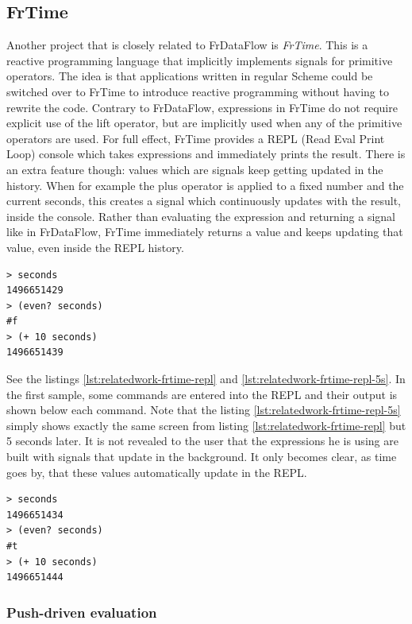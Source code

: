 \subsection{FrTime}

Another project that is closely related to FrDataFlow is \textit{FrTime}. This is a reactive programming language that implicitly implements signals for primitive operators. The idea is that applications written in regular Scheme could be switched over to FrTime to introduce reactive programming without having to rewrite the code. Contrary to FrDataFlow, expressions in FrTime do not require explicit use of the lift operator, but are implicitly used when any of the primitive operators are used. For full effect, FrTime provides a REPL (Read Eval Print Loop) console which takes expressions and immediately prints the result. There is an extra feature though: values which are signals keep getting updated in the history. When for example the plus operator is applied to a fixed number and the current seconds, this creates a signal which continuously updates with the result, inside the console. Rather than evaluating the expression and returning a signal like in FrDataFlow, FrTime immediately returns a value and keeps updating that value, even inside the REPL history. 

\begin{lstlisting}[caption={REPL in FrTime},captionpos=b,label={lst:relatedwork-frtime-repl}]
> seconds 			
1496651429
> (even? seconds) 
#f
> (+ 10 seconds)
1496651439
\end{lstlisting}

See the listings \ref{lst:relatedwork-frtime-repl} and \ref{lst:relatedwork-frtime-repl-5s}. In the first sample, some commands are entered into the REPL and their output is shown below each command.
Note that the listing \ref{lst:relatedwork-frtime-repl-5s} simply shows exactly the same screen from listing \ref{lst:relatedwork-frtime-repl} but 5 seconds later. It is not revealed to the user that the expressions he is using are built with signals that update in the background. It only becomes clear, as time goes by, that these values automatically update in the REPL.

\begin{lstlisting}[caption={REPL in FrTime, 5 seconds later},captionpos=b,label={lst:relatedwork-frtime-repl-5s}]
> seconds
1496651434
> (even? seconds)
#t
> (+ 10 seconds)
1496651444
\end{lstlisting}

\subsubsection{Push-driven evaluation}

